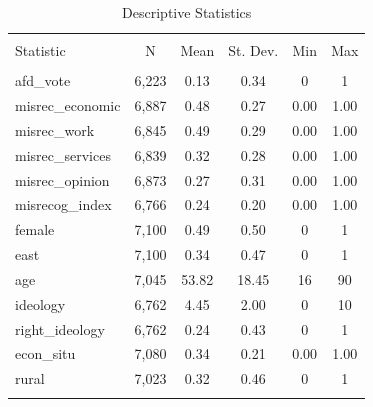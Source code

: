 
\begin{table}[!htbp] \centering 
  \caption{Descriptive Statistics} 
  \label{tab:summary_statistics} 
\begin{tabular}{@{\extracolsep{5pt}}lccccc} 
\\[-1.8ex]\hline 
\hline \\[-1.8ex] 
Statistic & \multicolumn{1}{c}{N} & \multicolumn{1}{c}{Mean} & \multicolumn{1}{c}{St. Dev.} & \multicolumn{1}{c}{Min} & \multicolumn{1}{c}{Max} \\ 
\hline \\[-1.8ex] 
afd\_vote & 6,223 & 0.13 & 0.34 & 0 & 1 \\ 
misrec\_economic & 6,887 & 0.48 & 0.27 & 0.00 & 1.00 \\ 
misrec\_work & 6,845 & 0.49 & 0.29 & 0.00 & 1.00 \\ 
misrec\_services & 6,839 & 0.32 & 0.28 & 0.00 & 1.00 \\ 
misrec\_opinion & 6,873 & 0.27 & 0.31 & 0.00 & 1.00 \\ 
misrecog\_index & 6,766 & 0.24 & 0.20 & 0.00 & 1.00 \\ 
female & 7,100 & 0.49 & 0.50 & 0 & 1 \\ 
east & 7,100 & 0.34 & 0.47 & 0 & 1 \\ 
age & 7,045 & 53.82 & 18.45 & 16 & 90 \\ 
ideology & 6,762 & 4.45 & 2.00 & 0 & 10 \\ 
right\_ideology & 6,762 & 0.24 & 0.43 & 0 & 1 \\ 
econ\_situ & 7,080 & 0.34 & 0.21 & 0.00 & 1.00 \\ 
rural & 7,023 & 0.32 & 0.46 & 0 & 1 \\ 
\hline \\[-1.8ex] 
\end{tabular} 
\end{table} 
